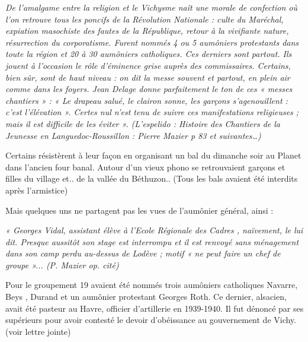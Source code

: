 \emph{De l’amalgame entre la religion et le Vichysme naît une morale de confection où
l’on retrouve tous les poncifs de la Révolution Nationale : culte du Maréchal,
expiation masochiste des fautes de la République, retour à la vivifiante nature,
résurrection du corporatisme. Furent nommés 4 ou 5 aumôniers protestants dans
toute la région et 20 à 30 aumôniers catholiques. Ces derniers sont partout. Ils
jouent à l’occasion le rôle d’éminence grise auprès des commissaires. Certains, bien
sûr, sont de haut niveau : on dit la messe souvent et partout, en plein air comme
dans les foyers. Jean Delage donne parfaitement le ton de ces « messes chantiers » :
« Le drapeau salué, le clairon sonne, les garçons s’agenouillent : c’est l’élévation ».
Certes nul n’est tenu de suivre ces manifestations religieuses ; mais il est difficile de
les éviter ». (L’espelido : Histoire des Chantiers de la Jeunesse en Languedoc-Roussillon : Pierre
Mazier p 83 et suivantes…)}

Certains résistèrent à leur façon en organisant un bal du dimanche soir au Planet dans l’ancien four
banal. Autour d’un vieux phono se retrouvaient garçons et filles du village et.. de la vallée du
Béthuzon.. (Tous les bals avaient été interdits après l’armistice)

Mais quelques uns ne partagent pas les vues de l’aumônier général, ainsi :

\emph{« Georges Vidal, assistant élève à l’Ecole Régionale des Cadres , naïvement, le lui dit. Presque
aussitôt son stage est interrompu et il est renvoyé sans ménagement dans son camp perdu au-dessus
de Lodève ; motif « ne peut faire un chef de groupe »... (P. Mazier op. cité)}

Pour le groupement 19 avaient été nommés trois aumôniers catholiques Navarre,
Beys , Durand et un aumônier protestant Georges Roth. Ce dernier, alsacien, avait été
pasteur au Havre, officier d’artillerie en 1939-1940. Il fut dénoncé par ses supérieurs
pour avoir contesté le devoir d’obéissance au gouvernement de Vichy. (voir lettre jointe)

